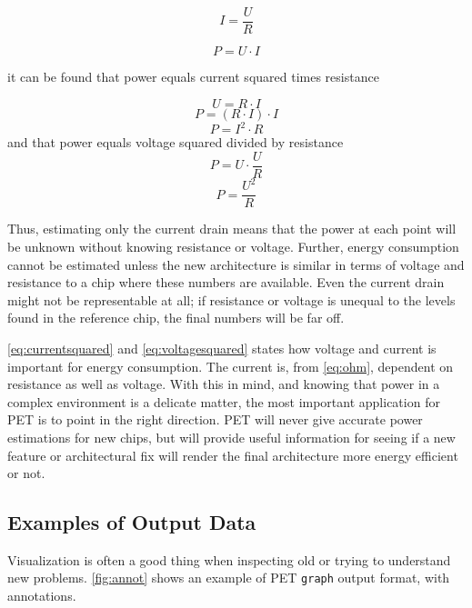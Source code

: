 \begin{equation}
I=\frac{U}{R}
\label{eq:ohm}
\end{equation}

\begin{equation}
P=U \cdot I
\label{eq:power}
\end{equation}

it can be found that power equals current squared times resistance

\[U=R \cdot I\]
\[P=(R \cdot I) \cdot I\]
\begin{equation}
P=I^2 \cdot R
\label{eq:currentsquared}
\end{equation}
and that power equals voltage squared divided by resistance
\[P=U \cdot \frac{U}{R}\]
\begin{equation}
P=\frac{U^2}{R}
\label{eq:voltagesquared}
\end{equation}

Thus, estimating only the current drain means that the power at each point will
be unknown without knowing resistance or voltage. Further, energy consumption
cannot be estimated unless the new architecture is similar in terms of voltage
and resistance to a chip where these numbers are available. Even the current
drain might not be representable at all; if resistance or voltage is unequal to
the levels found in the reference chip, the final numbers will be far off.

\autoref{eq:currentsquared} and \autoref{eq:voltagesquared} states how voltage
and current is important for energy consumption. The current is, from
\autoref{eq:ohm}, dependent on resistance as well as voltage. With this in mind,
and knowing that power in a complex environment is a delicate matter, the most
important application for PET is to point in the right direction. PET will never
give accurate power estimations for new chips, but will provide useful
information for seeing if a new feature or architectural fix will render the
final architecture more energy efficient or not.


\subsection{Examples of Output Data}

Visualization is often a good thing when inspecting old or trying to understand
new problems. \autoref{fig:annot} shows an example of PET \texttt{graph} output
format, with annotations.

